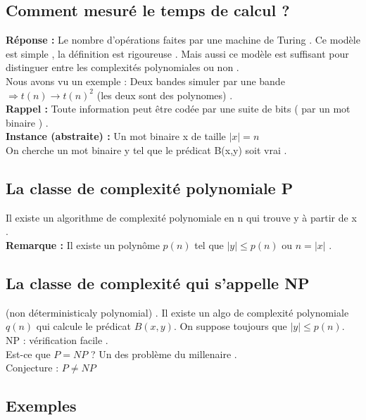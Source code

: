 \documentclass[base.tex]{subfiles}
\begin{document}
  \subsection{Comment mesuré le temps de calcul ?}
  \textbf{Réponse : }Le nombre d'opérations faites par une machine de Turing . Ce modèle est simple , la définition est rigoureuse . Mais aussi ce modèle est suffisant pour distinguer entre les complexités polynomiales ou non .\\
  Nous avons vu un exemple : Deux bandes simuler par une bande $\Rightarrow t(n) \rightarrow t(n)^2 $ (les deux sont des polynomes) .\\
  \textbf{Rappel :} Toute information peut être codée par une suite de bits ( par un mot binaire ) .\\
  \textbf{Instance (abstraite) :} Un mot binaire x de taille $|x|=n$ \\
  On cherche un mot binaire y tel que le prédicat B(x,y) soit vrai .\\
  \subsection{La classe de complexité polynomiale P}
  Il existe un algorithme de complexité polynomiale en n qui trouve y à partir de x .\\
  \textbf{Remarque : }Il existe un polynôme $p(n)$ tel que $|y| \leq p(n) $ ou $n=|x|$ .
  \subsection{La classe de complexité qui s'appelle NP}
  (non déterministicaly polynomial) . Il existe un algo de complexité polynomiale $q(n)$ qui calcule le prédicat $B(x,y)$. On suppose toujours que $|y|\leq p(n)$.
  \\
  NP : vérification facile .\\
  Est-ce que $P = NP$ ? Un des problème du millenaire .\\
  Conjecture : $P\neq NP$
  \subsection{Exemples }
  
\end{document}
